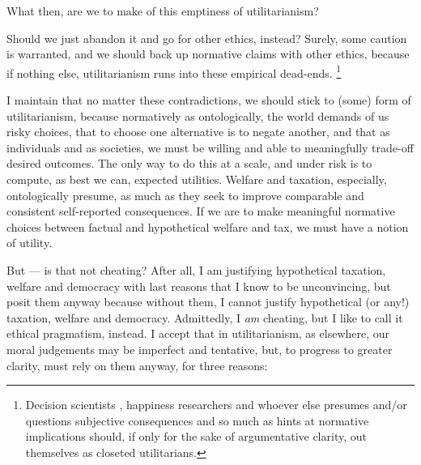 What then, are we to make of this emptiness of utilitarianism?

Should we just abandon it and go for other ethics, instead? Surely, some caution is warranted, and we should back up normative claims with other ethics, because if nothing else, utilitarianism runs into these empirical dead-ends.
\footnote{
	Decision scientists \citep[for example,][]{Kahneman2011}, happiness researchers \citep[for example,][]{Veenhoven-2000-aa} and whoever else presumes and/or questions subjective consequences and so much as hints at normative implications should, if only for the sake of argumentative clarity, out themselves as closeted utilitarians.
}

I maintain that no matter these contradictions, we should stick to (some) form of utilitarianism, because normatively as ontologically, the world demands of us risky choices, that to choose one alternative is to negate another, and that as individuals and as societies, we must be willing and able to meaningfully trade-off desired outcomes.
The only way to do this at a scale, and under risk is to compute, as best we can, expected utilities.
Welfare and taxation, especially, ontologically presume, as much as they seek to improve comparable and consistent self-reported consequences.
If we are to make meaningful normative choices between factual and hypothetical welfare and tax, we must have a notion of utility.

But --- is that not cheating?
After all, I am justifying hypothetical taxation, welfare and democracy with last reasons that I know to be unconvincing, but posit them anyway because without them, I cannot justify hypothetical (or any!) taxation, welfare and democracy.
Admittedly, I \emph{am} cheating, but I like to call it ethical pragmatism, instead.
I accept that in utilitarianism, as elsewhere, our moral judgements may be imperfect and tentative, but, to progress to greater clarity, must rely on them anyway, for three reasons:

